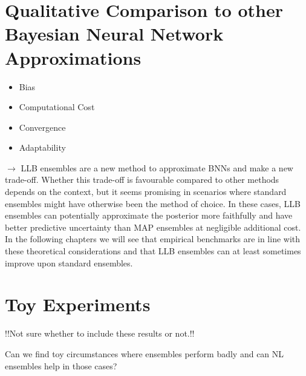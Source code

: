 \documentclass[../thesis.tex]{subfiles}
\begin{document}
\section{Qualitative Comparison to other Bayesian Neural Network Approximations}
\begin{itemize}
    \item Bias
    \item Computational Cost
    \item Convergence
    \item Adaptability
\end{itemize}
$\rightarrow$ LLB ensembles are a new method to approximate BNNs and make a new trade-off. Whether this trade-off is favourable compared to other methods depends on the context, but it seems promising in scenarios where standard ensembles might have otherwise been the method of choice. In these cases, LLB ensembles can potentially approximate the posterior more faithfully and have better predictive uncertainty than MAP ensembles at negligible additional cost. In the following chapters we will see that empirical benchmarks are in line with these theoretical considerations and that LLB ensembles can at least sometimes improve upon standard ensembles.


\section{Toy Experiments}
!!Not sure whether to include these results or not.!!

Can we find toy circumstances where ensembles perform badly and can NL ensembles help in those cases?
\end{document}

